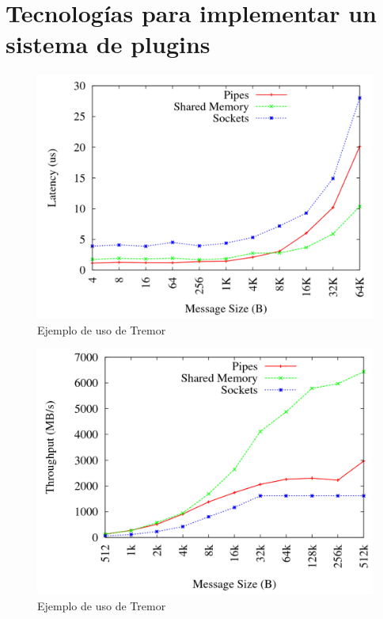 
\chapter{Tecnologías para implementar un sistema de plugins}


\begin{figure}
    \centering
    \includegraphics[width=\textwidth]{./Imagenes/venkataraman2015evaluation1.png}
    \caption{Ejemplo de uso de Tremor}%
    \label{fig:example_tremor}
\end{figure}

\begin{figure}
    \centering
    \includegraphics[width=\textwidth]{./Imagenes/venkataraman2015evaluation2.png}
    \caption{Ejemplo de uso de Tremor}%
    \label{fig:example_tremor}
\end{figure}

